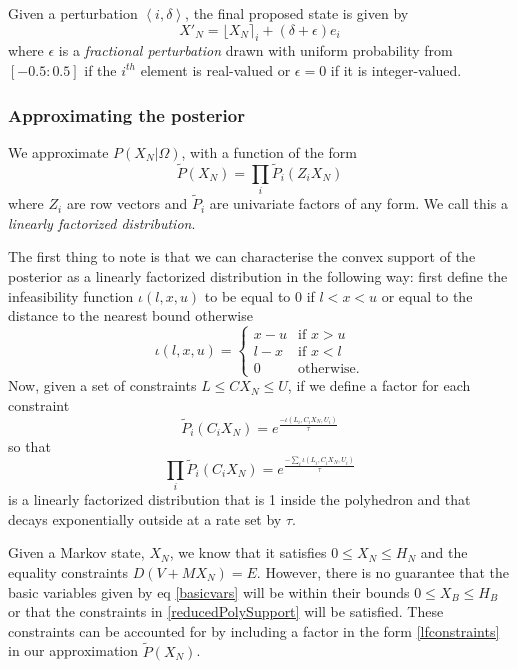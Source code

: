 \documentclass{article}
\begin{document}
Given a perturbation $\left<i,\delta\right>$, the final proposed state is given by
\[
X'_N = \lfloor X_N \rceil_i + (\delta + \epsilon)e_i
\]
where $\epsilon$ is a \textit{fractional perturbation} drawn with uniform probability from $[-0.5:0.5]$ if the $i^{th}$ element is real-valued or $\epsilon = 0$ if it is integer-valued.

\subsubsection{Approximating the posterior}

We approximate $P(X_N|\Omega)$, with a function of the form
\begin{equation}
\tilde{P}(X_N) = \prod_i \tilde{P}_i(Z_iX_N)
\end{equation}
where $Z_i$ are row vectors and $\tilde{P}_i$ are univariate factors of any form. We call this a \textit{linearly factorized distribution}.

The first thing to note is that we can characterise the convex support of the posterior as a linearly factorized distribution in the following way: first define the infeasibility function $\iota(l,x,u)$ to be equal to 0 if $l < x < u$ or equal to the distance to the nearest bound otherwise
\[
\iota(l,x,u) =
\begin{cases}
x-u & \text{if }x>u\\
l-x & \text{if }x<l\\
0 & \text{otherwise.}
\end{cases}
\]
Now, given a set of constraints $L \le CX_N \le U$, if we define a factor for each constraint
\begin{equation}
\tilde{P}_i(C_iX_N) = e^{\frac{-\iota(L_i,C_iX_N,U_i)}{\tau}}
\end{equation}
so that
\begin{equation}
\prod_i \tilde{P}_i(C_iX_N) = e^{\frac{-\sum_i \iota(L_i,C_iX_N,U_i)}{\tau}}
\label{lfconstraints}
\end{equation}
is a linearly factorized distribution that is 1 inside the polyhedron and that decays exponentially outside at a rate set by $\tau$.

Given a Markov state, $X_N$, we know that it satisfies $0 \le X_N \le H_N$ and the equality constraints $D(V+MX_N)=E$. However, there is no guarantee that the basic variables given by eq \eqref{basicvars} will be within their bounds $0 \le X_B \le H_B$ or that the constraints in \eqref{reducedPolySupport} will be satisfied. These constraints can be accounted for by including a factor in the form \eqref{lfconstraints} in our approximation $\tilde{P}(X_N)$.
\end{document}
